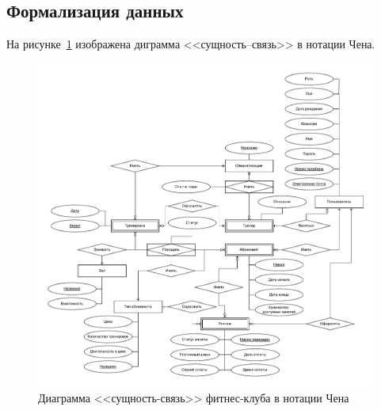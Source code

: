 \subsection{Формализация данных}

На рисунке~\ref{fig:er-chen} изображена диграмма <<сущность--связь>> в нотации Чена.

\begin{figure}[ht!]
	\begin{center}
		\includegraphics[scale=0.66]{./diag/er-chen.pdf}
	\end{center}
	\caption{Диаграмма <<сущность-связь>> фитнес-клуба в нотации Чена}
	\label{fig:er-chen}
\end{figure}

